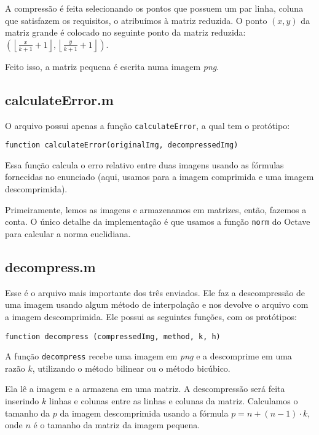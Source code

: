 \documentclass[12pt,letterpaper]{article}
\begin{document}
    A compressão é feita selecionando os pontos que possuem um par linha, coluna que satisfazem os requisitos, o atribuímos à matriz reduzida. O ponto $(x, y)$ da matriz grande é colocado no seguinte ponto da matriz reduzida:  $(\left \lfloor{\frac{x}{k+1}+1}\right \rfloor, \left \lfloor{\frac{y}{k+1}+1}\right \rfloor)$.

    Feito isso, a matriz pequena é escrita numa imagem \textit{png}.

    \subsection{calculateError.m}

    O arquivo possui apenas a função \texttt{calculateError}, a qual tem o protótipo:

    \begin{center}
        \texttt{function calculateError(originalImg, decompressedImg)}
    \end{center}

    Essa função calcula o erro relativo entre duas imagens usando as fórmulas fornecidas no enunciado (aqui, usamos para a imagem comprimida e uma imagem descomprimida).

    \clearpage

    Primeiramente, lemos as imagens e armazenamos em matrizes, então, fazemos a conta. O único detalhe da implementação é que usamos a função \texttt{norm} do Octave para calcular a norma euclidiana.

    \subsection{decompress.m}

    Esse é o arquivo mais importante dos três enviados. Ele faz a descompressão de uma imagem usando algum método de interpolação e nos devolve o arquivo com a imagem descomprimida. Ele possui as seguintes funções, com os protótipos:

    \begin{center}
        \texttt{function decompress (compressedImg, method, k, h)}
    \end{center}

    A função \texttt{decompress} recebe uma imagem em \textit{png} e a descomprime em uma razão $k$, utilizando o método bilinear ou o método bicúbico.

    Ela lê a imagem e a armazena em uma matriz. A descompressão será feita inserindo $k$ linhas e colunas entre as linhas e colunas da matriz. Calculamos o tamanho da $p$ da imagem descomprimida usando a fórmula $p = n+(n-1)\cdot k$, onde $n$ é o tamanho da matriz da imagem pequena.
\end{document}
